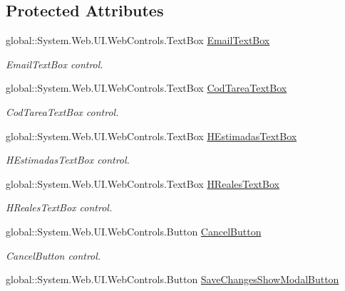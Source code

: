 \subsection*{Protected Attributes}
\begin{DoxyCompactItemize}
\item 
global\+::\+System.\+Web.\+U\+I.\+Web\+Controls.\+Text\+Box \mbox{\hyperlink{classWebApplication_1_1UserPage_1_1InstanciarTarea_ac7c1078d8d7829f9eb3718655ef0d90f}{Email\+Text\+Box}}
\begin{DoxyCompactList}\small\item\em Email\+Text\+Box control. \end{DoxyCompactList}\item 
global\+::\+System.\+Web.\+U\+I.\+Web\+Controls.\+Text\+Box \mbox{\hyperlink{classWebApplication_1_1UserPage_1_1InstanciarTarea_acd42652c937ee0ce36c9bc8800df4bcf}{Cod\+Tarea\+Text\+Box}}
\begin{DoxyCompactList}\small\item\em Cod\+Tarea\+Text\+Box control. \end{DoxyCompactList}\item 
global\+::\+System.\+Web.\+U\+I.\+Web\+Controls.\+Text\+Box \mbox{\hyperlink{classWebApplication_1_1UserPage_1_1InstanciarTarea_aa20d337e519f4e12ca3ab1d5070fe47f}{H\+Estimadas\+Text\+Box}}
\begin{DoxyCompactList}\small\item\em H\+Estimadas\+Text\+Box control. \end{DoxyCompactList}\item 
global\+::\+System.\+Web.\+U\+I.\+Web\+Controls.\+Text\+Box \mbox{\hyperlink{classWebApplication_1_1UserPage_1_1InstanciarTarea_a2e84cf99ac127f7b04854789af2b032e}{H\+Reales\+Text\+Box}}
\begin{DoxyCompactList}\small\item\em H\+Reales\+Text\+Box control. \end{DoxyCompactList}\item 
global\+::\+System.\+Web.\+U\+I.\+Web\+Controls.\+Button \mbox{\hyperlink{classWebApplication_1_1UserPage_1_1InstanciarTarea_a365f896c950c8243ecefecb84959e9e6}{Cancel\+Button}}
\begin{DoxyCompactList}\small\item\em Cancel\+Button control. \end{DoxyCompactList}\item 
global\+::\+System.\+Web.\+U\+I.\+Web\+Controls.\+Button \mbox{\hyperlink{classWebApplication_1_1UserPage_1_1InstanciarTarea_ac543f83b3a3b6db54c3d5fa377fbb55e}{Save\+Changes\+Show\+Modal\+Button}}

\end{DoxyCompactItemize}
